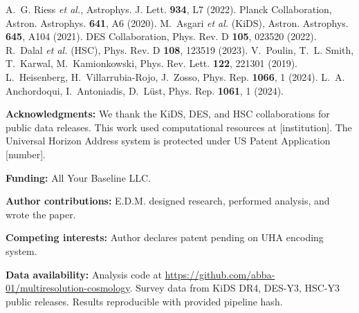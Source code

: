 \documentclass[12pt]{article}
\begin{document}
\begin{thebibliography}{99}
 A.~G. Riess \textit{et al.}, Astrophys. J. Lett. \textbf{934}, L7 (2022).
 Planck Collaboration, Astron. Astrophys. \textbf{641}, A6 (2020).
 M.~Asgari \textit{et al.} (KiDS), Astron. Astrophys. \textbf{645}, A104 (2021).
 DES Collaboration, Phys. Rev. D \textbf{105}, 023520 (2022).
 R.~Dalal \textit{et al.} (HSC), Phys. Rev. D \textbf{108}, 123519 (2023).
 V.~Poulin, T.~L. Smith, T.~Karwal, M.~Kamionkowski, Phys. Rev. Lett. \textbf{122}, 221301 (2019).
 L.~Heisenberg, H.~Villarrubia-Rojo, J.~Zosso, Phys. Rep. \textbf{1066}, 1 (2024).
 L.~A. Anchordoqui, I.~Antoniadis, D.~Lüst, Phys. Rep. \textbf{1061}, 1 (2024).
\end{thebibliography}

\noindent\textbf{Acknowledgments:} We thank the KiDS, DES, and HSC collaborations for public data releases. This work used computational resources at [institution]. The Universal Horizon Address system is protected under US Patent Application [number].

\noindent\textbf{Funding:} All Your Baseline LLC.

\noindent\textbf{Author contributions:} E.D.M. designed research, performed analysis, and wrote the paper.

\noindent\textbf{Competing interests:} Author declares patent pending on UHA encoding system.

\noindent\textbf{Data availability:} Analysis code at \url{https://github.com/abba-01/multiresolution-cosmology}. Survey data from KiDS DR4, DES-Y3, HSC-Y3 public releases. Results reproducible with provided pipeline hash.
\end{document}
